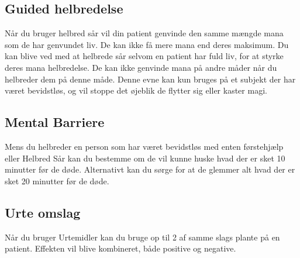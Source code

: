 \subsection{Guided helbredelse}
Når du bruger helbred sår vil din patient genvinde den samme mængde mana som de har genvundet liv. De kan ikke få mere mana end deres maksimum. Du kan blive ved med at helbrede sår selvom en patient har fuld liv, for at styrke deres mana helbredelse. De kan ikke genvinde mana på andre måder når du helbreder dem på denne måde. Denne evne kan kun bruges på et subjekt der har været bevidstløs, og vil stoppe det øjeblik de flytter sig eller kaster magi.

\subsection{Mental Barriere}
Mens du helbreder en person som har været bevidstløs med enten førstehjælp eller Helbred Sår kan du bestemme om de vil kunne huske hvad der er sket 10 minutter før de døde. Alternativt kan du sørge for at de glemmer alt hvad der er sket 20 minutter før de døde.

\subsection{Urte omslag}
Når du bruger Urtemidler kan du bruge op til 2 af samme slags plante på en patient. Effekten vil blive kombineret, både positive og negative.